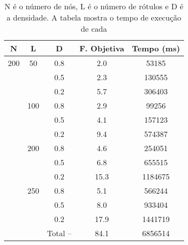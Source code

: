 \documentclass{sig-alternate-05-2015}
\begin{document}
\begin{table}[!h]


\begin{tabular}{ccccc}
        \hline \rule[-2ex]{0pt}{5.5ex} N & L & D  & F. Objetiva & Tempo (ms) \\ 
        \hline \rule[-2ex]{0pt}{5.5ex} 200 & 50 & 0.8 & 2.0 & 53185 \\ 
        \rule[-2ex]{0pt}{5.5ex}  &  & 0.5 & 2.3 & 130555 \\ 
         \rule[-2ex]{0pt}{5.5ex}  &  & 0.2 & 5.7 & 306403 \\ 
         \rule[-2ex]{0pt}{5.5ex}  & 100 & 0.8 & 2.9 & 99256 \\ 
         \rule[-2ex]{0pt}{5.5ex}  &  & 0.5 & 4.1 & 157123 \\ 
         \rule[-2ex]{0pt}{5.5ex}  &  & 0.2 & 9.4 & 574387 \\ 
         \rule[-2ex]{0pt}{5.5ex}  & 200 & 0.8 & 4.6 & 254051 \\ 
         \rule[-2ex]{0pt}{5.5ex}  &  & 0.5 & 6.8 & 655515 \\ 
         \rule[-2ex]{0pt}{5.5ex}  &  & 0.2 & 15.3 & 1184675 \\ 
         \rule[-2ex]{0pt}{5.5ex}  & 250 & 0.8 & 5.1 & 566244 \\ 
         \rule[-2ex]{0pt}{5.5ex}  &  & 0.5 & 8.0 & 933404 \\ 
         \rule[-2ex]{0pt}{5.5ex}  &  & 0.2 & 17.9 & 1441719 \\ 
        \hline \rule[-2ex]{0pt}{5.5ex}  &  & Total --  & 84.1 & 6856514 \\ 
        \hline 
\end{tabular} 
\caption{N é o número de nós, L é o número de rótulos e D é a densidade.  A tabela mostra o tempo de execução de cada}
\label{tab3}
\end{table}
\end{document}
